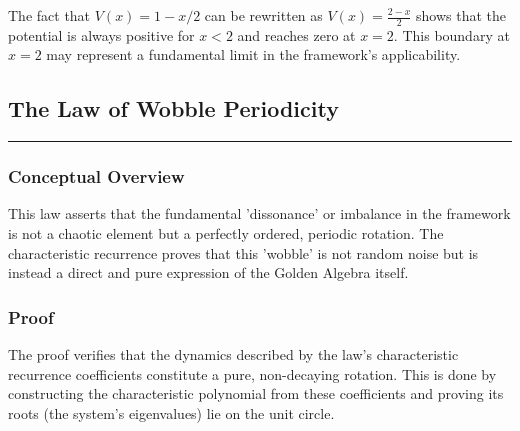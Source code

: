The fact that $V(x) = 1 - x/2$ can be rewritten as $V(x) = \frac{2-x}{2}$ shows that the potential is always positive for $x < 2$ and reaches zero at $x = 2$. This boundary at $x = 2$ may represent a fundamental limit in the framework's applicability.


\subsection*{The Law of Wobble Periodicity}
\hrule
\vspace{0.3cm}
\vspace{0.5cm}

\subsubsection*{Conceptual Overview}
This law asserts that the fundamental 'dissonance' or imbalance in the framework is not a chaotic element but a perfectly ordered, periodic rotation. The characteristic recurrence proves that this 'wobble' is not random noise but is instead a direct and pure expression of the Golden Algebra itself.

\subsubsection*{Proof}
The proof verifies that the dynamics described by the law's characteristic recurrence coefficients constitute a pure, non-decaying rotation. This is done by constructing the characteristic polynomial from these coefficients and proving its roots (the system's eigenvalues) lie on the unit circle.

